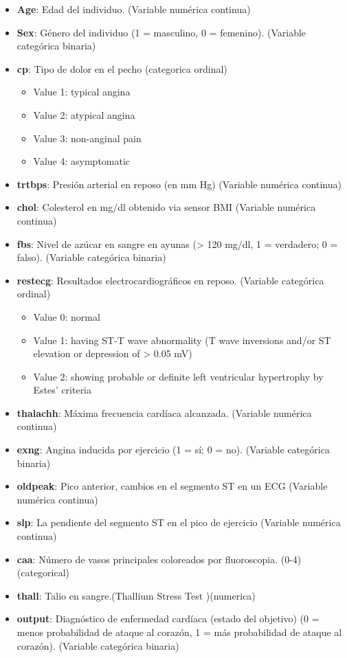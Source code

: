 \documentclass[
]{article}
\begin{document}
\begin{itemize}
\item
  \textbf{Age}: Edad del individuo. (Variable numérica continua)
\item
  \textbf{Sex}: Género del individuo (1 = masculino, 0 = femenino).
  (Variable categórica binaria)
\item
  \textbf{cp}: Tipo de dolor en el pecho (categorica ordinal)

  \begin{itemize}
  \item
    Value 1: typical angina
  \item
    Value 2: atypical angina
  \item
    Value 3: non-anginal pain
  \item
    Value 4: asymptomatic
  \end{itemize}
\item
  \textbf{trtbps}: Presión arterial en reposo (en mm Hg) (Variable
  numérica continua)
\item
  \textbf{chol}: Colesterol en mg/dl obtenido via sensor BMI (Variable
  numérica continua)
\item
  \textbf{fbs}: Nivel de azúcar en sangre en ayunas (\textgreater{} 120
  mg/dl, 1 = verdadero; 0 = falso). (Variable categórica binaria)
\item
  \textbf{restecg}: Resultados electrocardiográficos en reposo.
  (Variable categórica ordinal)

  \begin{itemize}
  \item
    Value 0: normal
  \item
    Value 1: having ST-T wave abnormality (T wave inversions and/or ST
    elevation or depression of \textgreater{} 0.05 mV)
  \item
    Value 2: showing probable or definite left ventricular hypertrophy
    by Estes' criteria
  \end{itemize}
\item
  \textbf{thalachh}: Máxima frecuencia cardíaca alcanzada. (Variable
  numérica continua)
\item
  \textbf{exng}: Angina inducida por ejercicio (1 = sí; 0 = no).
  (Variable categórica binaria)
\item
  \textbf{oldpeak}: Pico anterior, cambios en el segmento ST en un ECG
  (Variable numérica continua)
\item
  \textbf{slp}: La pendiente del segmento ST en el pico de ejercicio
  (Variable numérica continua)
\item
  \textbf{caa}: Número de vasos principales coloreados por fluoroscopia.
  (0-4) (categorical)
\item
  \textbf{thall}: Talio en sangre.(Thallium Stress Test )(numerica)
\item
  \textbf{output}: Diagnóstico de enfermedad cardíaca (estado del
  objetivo) (0 = menos probabilidad de ataque al corazón, 1 = más
  probabilidad de ataque al corazón). (Variable categórica binaria)
\end{itemize}
\end{document}
